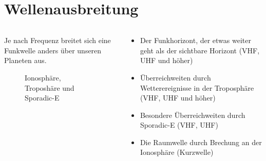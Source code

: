 
\section{Wellenausbreitung}
\label{section:wellenausbreitung}
\begin{frame}%

\begin{columns}
    \begin{column}{0.48\textwidth}
    Je nach Frequenz breitet sich eine Funkwelle anders über unseren Planeten aus.


\begin{figure}
    \caption{\scriptsize Ionosphäre, Troposhäre und Sporadic-E}
    \label{n_ionosphäre}
\end{figure}


    \end{column}
   \begin{column}{0.48\textwidth}
       \begin{itemize}
  \item Der Funkhorizont, der etwas weiter geht als der sichtbare Horizont (VHF, UHF und höher)
  \item Überreichweiten durch Wetterereignisse in der Troposphäre (VHF, UHF und höher)
  \item Besondere Überreichweiten durch Sporadic-E (VHF, UHF)
  \item Die Raumwelle durch Brechung an der Ionosphäre (Kurzwelle)
  \end{itemize}

   \end{column}
\end{columns}

\end{frame}%
